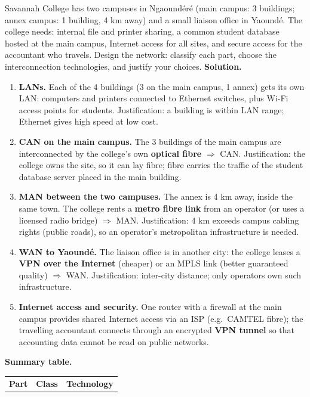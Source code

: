 \documentclass[11pt]{article}
\newcommand{\cle}[1]{{\popxbold\color{popdark}#1}}
\begin{document}
\begin{exoresolu}
Savannah College has two campuses in Ngaound\'er\'e (main campus: 3 buildings; annex campus: 1 building, 4 km away) and a small liaison office in Yaound\'e. The college needs: internal file and printer sharing, a common student database hosted at the main campus, Internet access for all sites, and secure access for the accountant who travels. Design the network: classify each part, choose the interconnection technologies, and justify your choices.
\tcblower
\textbf{Solution.}
\begin{enumerate}
\item \textbf{LANs.} Each of the 4 buildings (3 on the main campus, 1 annex) gets its own \cle{LAN}: computers and printers connected to Ethernet switches, plus Wi-Fi access points for students. Justification: a building is within LAN range; Ethernet gives high speed at low cost.
\item \textbf{CAN on the main campus.} The 3 buildings of the main campus are interconnected by the college's own \textbf{optical fibre} $\Rightarrow$ \cle{CAN}. Justification: the college owns the site, so it can lay fibre; fibre carries the traffic of the student database server placed in the main building.
\item \textbf{MAN between the two campuses.} The annex is 4 km away, inside the same town. The college rents a \textbf{metro fibre link} from an operator (or uses a licensed radio bridge) $\Rightarrow$ \cle{MAN}. Justification: 4 km exceeds campus cabling rights (public roads), so an operator's metropolitan infrastructure is needed.
\item \textbf{WAN to Yaound\'e.} The liaison office is in another city: the college leases a \textbf{VPN over the Internet} (cheaper) or an MPLS link (better guaranteed quality) $\Rightarrow$ \cle{WAN}. Justification: inter-city distance; only operators own such infrastructure.
\item \textbf{Internet access and security.} One router with a firewall at the main campus provides shared Internet access via an ISP (e.g.\ CAMTEL fibre); the travelling accountant connects through an encrypted \textbf{VPN tunnel} so that accounting data cannot be read on public networks.
\end{enumerate}
\textbf{Summary table.}
\begin{center}
\begin{tabularx}{\linewidth}{|l|X|X|}
\hline
\rowcolor{popblueL} \textbf{Part} & \textbf{Class} & \textbf{Technology} \\

\end{tabularx}
\end{center}
\end{exoresolu}
\end{document}
